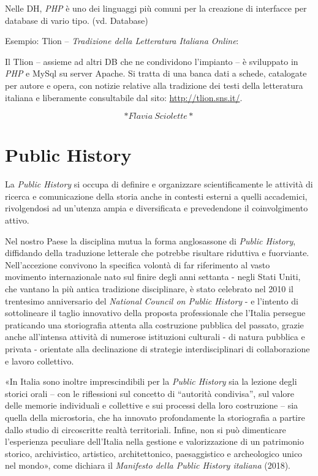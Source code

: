 \documentclass[
  b5paper,
  twoside,
  12pt,
  chapterprefix=false,
  bibliography=totocnumbered,
  parskip=false]{scrbook}
\begin{document}
Nelle DH, \emph{PHP} è uno dei linguaggi più comuni per la creazione di
interfacce per database di vario tipo. (vd. Database)

Esempio: Tlion -- \emph{Tradizione della Letteratura Italiana Online}:

Il Tlion -- assieme ad altri DB che ne condividono l'impianto -- è
sviluppato in \emph{PHP} e MySql su server Apache. Si tratta di una banca
dati a schede, catalogate per autore e opera, con notizie relative alla
tradizione dei testi della letteratura italiana e liberamente
consultabile dal sito: \url{http://tlion.sns.it/}.

\[*Flavia~Sciolette*\]

\hypertarget{public-history}{%
\chapter{Public History}\label{public-history}}

La \emph{Public History} si occupa di definire e organizzare scientificamente
le attività di ricerca e comunicazione della storia anche in contesti
esterni a quelli accademici, rivolgendosi ad un'utenza ampia e
diversificata e prevedendone il coinvolgimento attivo.

Nel nostro Paese la disciplina mutua la forma anglosassone di \emph{Public
History}, diffidando della traduzione letterale che potrebbe risultare
riduttiva e fuorviante. Nell'accezione convivono la specifica volontà di
far riferimento al vasto movimento internazionale nato sul finire degli
anni settanta - negli Stati Uniti, che vantano la più antica tradizione
disciplinare, è stato celebrato nel 2010 il trentesimo anniversario del
\emph{National Council on Public History} - e l'intento di sottolineare il
taglio innovativo della proposta professionale che l'Italia persegue
praticando una storiografia attenta alla costruzione pubblica del
passato, grazie anche all'intensa attività di numerose istituzioni
culturali - di natura pubblica e privata - orientate alla declinazione
di strategie interdisciplinari di collaborazione e lavoro collettivo.

«In Italia sono inoltre imprescindibili per la \emph{Public History} sia la
lezione degli storici orali -- con le riflessioni sul concetto di
\enquote{autorità condivisa}, sul valore delle memorie individuali e collettive
e sui processi della loro costruzione -- sia quella della microstoria,
che ha innovato profondamente la storiografia a partire dallo studio di
circoscritte realtà territoriali. Infine, non si può dimenticare
l'esperienza peculiare dell'Italia nella gestione e valorizzazione di un
patrimonio storico, archivistico, artistico, architettonico,
paesaggistico e archeologico unico nel mondo», come dichiara il
\emph{Manifesto della Public History italiana} (2018).
\end{document}
